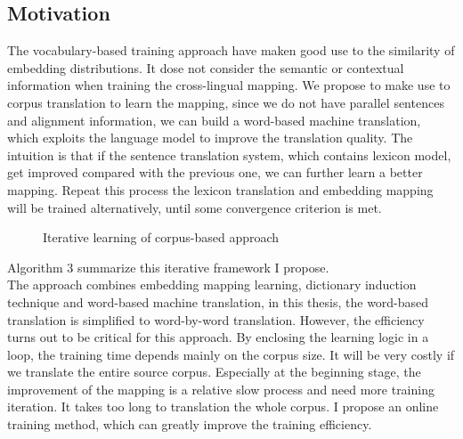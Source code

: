 \subsection{Motivation}
The vocabulary-based training approach have maken good use to the similarity of embedding distributions. It dose not consider the semantic or contextual information when training the cross-lingual mapping. We propose to make use to corpus translation to learn the mapping, since we do not have parallel sentences and alignment information, we can build a word-based machine translation, which exploits the language model to improve the translation quality. The intuition is that if the sentence translation system, which contains lexicon model, get improved compared with the previous one, we can further learn a better mapping. Repeat this process the lexicon translation and embedding mapping will be trained alternatively, until some convergence criterion is met.  
\begin{figure}[H]
	\centering
	\begin{minipage}{.7\linewidth}
		\begin{algorithm}[H]
			\SetAlgoLined
			\caption{Iterative learning of corpus-based approach}
		\end{algorithm}
	\end{minipage}
\end{figure}

Algorithm 3 summarize this iterative framework I propose.\\
The approach combines embedding mapping learning, dictionary induction technique and word-based machine translation, in this thesis, the word-based translation is simplified to word-by-word translation. However, the efficiency turns out to be critical for this approach. By enclosing the learning logic in a loop, the training time depends mainly on the corpus size. It will be very costly if we translate the entire source corpus. Especially at the beginning stage, the improvement of the mapping is a relative slow process and need more training iteration. It takes too long to translation the whole corpus. I propose an online training method, which can greatly improve the training efficiency. 

